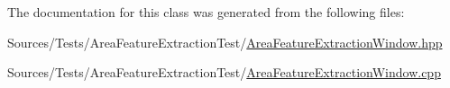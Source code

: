 The documentation for this class was generated from the following files\+:\begin{DoxyCompactItemize}
\item 
Sources/\+Tests/\+Area\+Feature\+Extraction\+Test/\hyperlink{_area_feature_extraction_window_8hpp}{Area\+Feature\+Extraction\+Window.\+hpp}\item 
Sources/\+Tests/\+Area\+Feature\+Extraction\+Test/\hyperlink{_area_feature_extraction_window_8cpp}{Area\+Feature\+Extraction\+Window.\+cpp}\end{DoxyCompactItemize}
